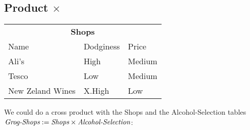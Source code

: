 \subsection{Product $\times$}

\begin{center}
  \begin{tabular}{lll}
    \multicolumn{3}{c}{\textbf{Shops}}\\
    {Name}           & {Dodginess} & {Price}\\ \hline
    Ali's            & High        & Medium \\
    Tesco            & Low         & Medium \\
    New Zeland Wines & X.High      & Low    \\
  \end{tabular}
\end{center}

We could do a cross product with the Shops and the Alcohol-Selection tables
$\text{\it Grog-Shops} := \text{\it Shops} \times \text{\it Alcohol-Selection}$:

